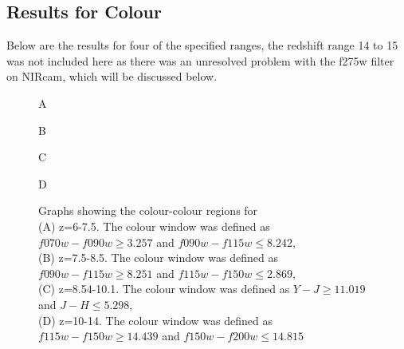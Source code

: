 	\subsection{Results for Colour} %
	\label{sub:Results_for_Colour}
		Below are the results for four of the specified ranges, the redshift range 14 to 15 was not included here as there was an unresolved problem with the f275w filter on NIRcam, which will be discussed below.
		\begin{figure}[!htbp]
			\begin{minipage}[c]{0.5\linewidth}
				\centering
					\begingroup{}
						\resizebox{\textwidth}{!}{%
							
						}\endgroup
				\caption{A\label{fig:col1}}
			\end{minipage}
			\begin{minipage}[c]{0.5\linewidth}
				\centering
					\begingroup{}
						\resizebox{\textwidth}{!}{%
							
						}\endgroup
				\caption{B\label{fig:col2}}
			\end{minipage}
			\begin{minipage}[c]{0.5\linewidth}
				\centering
					\begingroup{}
						\resizebox{\textwidth}{!}{%
							
						}\endgroup
				\caption{C\label{fig:col3}}
			\end{minipage}
			\begin{minipage}[c]{0.5\linewidth}
				\centering
					\begingroup{}
						\resizebox{\textwidth}{!}{%
							
						}\endgroup
				\caption{D\label{fig:col4}}
			\end{minipage}
			\caption{Graphs showing the colour-colour regions for \\
			(A) z=6-7.5. The colour window was defined as $f070w-f090w{\ge}3.257$ and $f090w-f115w{\le}8.242$,\\
			(B) z=7.5-8.5. The colour window was defined as $f090w-f115w{\ge}8.251$ and $f115w-f150w{\le}2.869$, \\
			(C) z=8.54-10.1. The colour window was defined as $Y-J{\ge}11.019$ and $J-H{\le}5.298$, \\
			(D) z=10-14. The colour window was defined as $f115w-f150w{\ge}14.439$ and $f150w-f200w{\le}14.815$}
		\end{figure}

